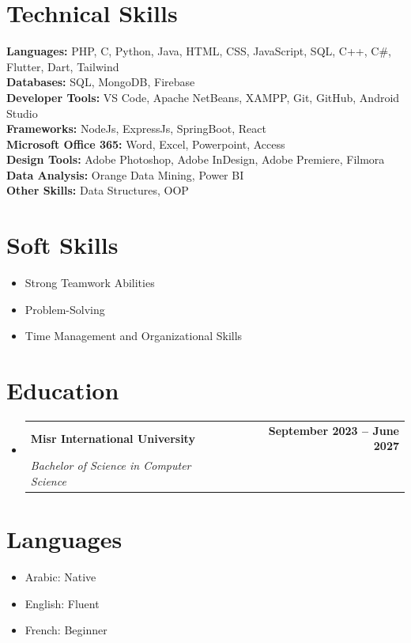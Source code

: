 \documentclass[letterpaper,11pt]{article}
\makeatletter
\newcommand{\resumeItem}[1]{
  \item\small{
    {#1 \vspace{-2pt}}
  }
}
\newcommand{\resumeSubheading}[4]{
  \vspace{-2pt}\item
    \begin{tabular*}{1.0\textwidth}[t]{l@{\extracolsep{\fill}}r}
      \textbf{#1} & \textbf{\small #2} \\
      \textit{\small#3} & \textit{\small #4} \\
    \end{tabular*}\vspace{-7pt}
}
\newcommand{\resumeSubHeadingListStart}{\begin{itemize}[leftmargin=0.0in, label={}]}
\newcommand{\resumeSubHeadingListEnd}{\end{itemize}}
\newcommand{\resumeItemListStart}{\begin{itemize}}
\newcommand{\resumeItemListEnd}{\end{itemize}\vspace{-5pt}}
\makeatother
\begin{document}
\section{Technical Skills}
 \begin{itemize}[leftmargin=0.15in, label={}]
    \small{\item{
     \textbf{Languages:}{ PHP, C, Python, Java, HTML, CSS, JavaScript, SQL, C++, C\#, Flutter, Dart, Tailwind} \\
     \textbf{Databases:}{ SQL, MongoDB, Firebase} \\
     \textbf{Developer Tools:}{ VS Code, Apache NetBeans, XAMPP, Git, GitHub, Android Studio} \\
     \textbf{Frameworks:}{ NodeJs, ExpressJs, SpringBoot, React} \\
     \textbf{Microsoft Office 365:}{ Word, Excel, Powerpoint, Access} \\
     \textbf{Design Tools:}{ Adobe Photoshop, Adobe InDesign, Adobe Premiere, Filmora} \\
     \textbf{Data Analysis:}{ Orange Data Mining, Power BI} \\
     \textbf{Other Skills:}{ Data Structures, OOP}
    }}
 \end{itemize}
 \vspace{-16pt}

\section{Soft Skills}
  \resumeItemListStart
    \resumeItem{Strong Teamwork Abilities}
    \resumeItem{Problem-Solving}
    \resumeItem{Time Management and Organizational Skills}
  \resumeItemListEnd

\section{Education}
  \resumeSubHeadingListStart
    \resumeSubheading
      {Misr International University}{September 2023 -- June 2027}
      {Bachelor of Science in Computer Science}{}
  \resumeSubHeadingListEnd

\section{Languages}
  \resumeItemListStart
    \resumeItem{Arabic: Native}
    \resumeItem{English: Fluent}
    \resumeItem{French: Beginner}
  \resumeItemListEnd
\end{document}
